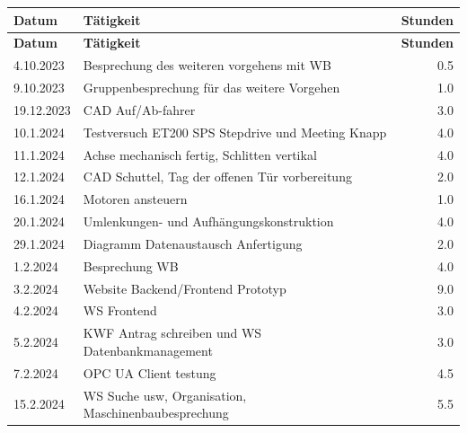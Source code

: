 \begin{longtable}{|l|p{10cm}|r|}
    \hline
    \textbf{Datum} & \textbf{Tätigkeit} & \textbf{Stunden} \\
    \hline
    \endfirsthead

    \hline
    \textbf{Datum} & \textbf{Tätigkeit} & \textbf{Stunden} \\
    \hline
    \endhead

    \hline
    \endfoot

    \hline
    \endlastfoot

4.10.2023&Besprechung des weiteren vorgehens mit WB	&0.5\\
9.10.2023&Gruppenbesprechung für das weitere Vorgehen	&1.0\\

19.12.2023	&CAD Auf/Ab-fahrer	&3.0\\

10.1.2024	&Testversuch ET200 SPS Stepdrive und Meeting Knapp&	4.0\\
11.1.2024	&Achse mechanisch fertig, Schlitten vertikal&	4.0\\
12.1.2024	&CAD Schuttel, Tag der offenen Tür vorbereitung	&2.0\\
16.1.2024	&Motoren ansteuern&	1.0	\\
20.1.2024	&Umlenkungen- und Aufhängungskonstruktion&	4.0\\
29.1.2024	&Diagramm Datenaustausch Anfertigung&   2.0\\
1.2.2024	&Besprechung WB&	4.0\\
3.2.2024	&Website Backend/Frontend Prototyp&	9.0\\
4.2.2024	&WS Frontend&	3.0\\

5.2.2024	&KWF Antrag schreiben und WS Datenbankmanagement&	3.0\\
7.2.2024	&OPC UA Client testung&	4.5\\
15.2.2024	&WS Suche usw, Organisation, Maschinenbaubesprechung	&5.5\\


\end{longtable}
